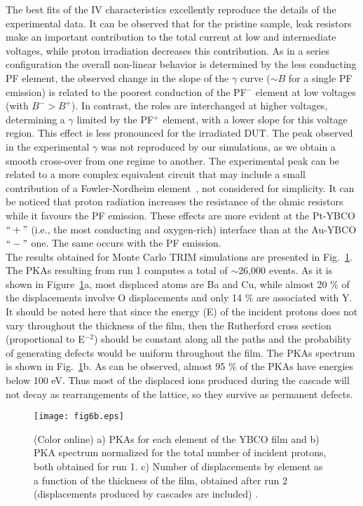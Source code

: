 \documentclass[square,aip,preprint,showkeys,superscriptaddress]{revtex4}
\begin{document}
The best fits of the IV characteristics excellently reproduce the details of the experimental data. It can be observed that for the pristine sample, leak resistors make an important contribution to the total current at low and intermediate voltages, while proton irradiation decreases this contribution. As in a series configuration the overall non-linear behavior is determined by the less conducting PF element, the observed change in the slope of the $\gamma$ curve ($\sim B$ for a single PF emission) is related to the poorest conduction of the PF$^-$ element at low voltages (with $B^- > B^+$). In contrast, the roles are interchanged at higher voltages, determining a $\gamma$ limited by the PF$^+$ element, with a lower slope for this voltage region. This effect is less pronounced for the irradiated DUT.  The peak observed in the experimental $\gamma$ was not reproduced by our simulations, as we obtain a smooth cross-over from one regime to another. The experimental peak can be related to a more complex equivalent circuit that may include a small contribution of a Fowler-Nordheim element~\cite{Sze06}, not considered for simplicity.
It can be noticed that proton radiation increases the resistance of the ohmic resistors while it favours the PF emission. These effects are more evident at the Pt-YBCO $``+"$ (i.e., the most conducting and oxygen-rich) interface than at the Au-YBCO $``-"$ one. The same occurs with the PF emission. \\


The results obtained for Monte Carlo TRIM simulations are presented in Fig.~\ref{fig:TRIM}. The PKAs resulting from run 1 computes a total of $\sim$26,000 events. As it is shown in Figure~\ref{fig:TRIM}a, most displaced atoms are Ba and Cu, while almost 20 \% of the displacements involve O displacements and only 14 \% are associated with Y. It should be noted here that since the energy (E) of the incident protons does not vary throughout the thickness of the film, then the Rutherford cross section (proportional to E$^{-2}$) should be constant along all the paths and the probability of generating defects would be uniform throughout the film. The PKAs spectrum is shown in Fig.~\ref{fig:TRIM}b. As can be observed, almost 95 \% of  the PKAs have energies below 100 eV. Thus most of the displaced ions produced during the cascade will not decay as rearrangements of the lattice, so they survive as permanent defects.

\begin{figure} [t]
	\vspace{0mm}
	\centerline{\texttt{[image: fig6b.eps]}}
	\vspace{-5mm}\caption{(Color online) a) PKAs for each element of the YBCO film and b) PKA spectrum normalized for the total number of incident protons, both obtained for run 1. c) Number of displacements  by element as a function of the thickness of the film, obtained after run 2 (displacements produced by cascades are included) .} 
	\vspace{-0mm}
	\label{fig:TRIM}
\end{figure}
\end{document}
